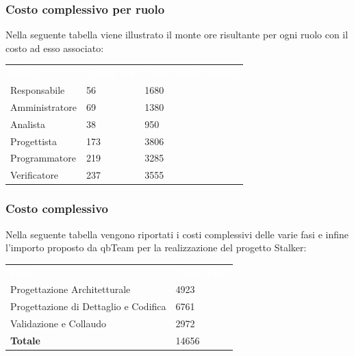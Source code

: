 \subsubsection{Costo complessivo per ruolo}
Nella seguente tabella viene illustrato il monte ore risultante per ogni ruolo con il costo ad esso associato:
{
	\renewcommand{\arraystretch}{2}
\begin{table}[h]
	\caption{Tabella del costo complessivo per ruolo}
	\begin{longtable}{ C{3cm} C{2cm} C{4cm}}
		\textcolor{white}{\textbf{Ruolo}} & \textcolor{white}{\textbf{Totale ore}} & \textcolor{white}{\textbf{Costo ruolo in euro}}\\	
        
        Responsabile & 56 &  1680\\
        Amministratore & 69 & 1380 \\
        Analista & 38 & 950 \\
        Progettista & 173 & 3806 \\
        Programmatore & 219 & 3285 \\
        Verificatore & 237 & 3555 \\
        	
	\end{longtable}
\end{table}
}

\subsubsection{Costo complessivo}
Nella seguente tabella vengono riportati i costi complessivi delle varie fasi e infine l'importo proposto da qbTeam per la realizzazione del progetto Stalker:\\
{
	\renewcommand{\arraystretch}{2}

	\begin{table}[h]
	\caption{Tabella del costo complessivo}
	\begin{longtable}{ C{5cm} C{5cm}}
		\textcolor{white}{\textbf{Fase}} & \textcolor{white}{\textbf{Costo Fase}}\\	
		
		Progettazione Architetturale & 4923 \\
		Progettazione di Dettaglio e Codifica & 6761 \\
		Validazione e Collaudo & 2972 \\
		\textbf{Totale} & 14656\\
		
	\end{longtable}
\end{table}
}



